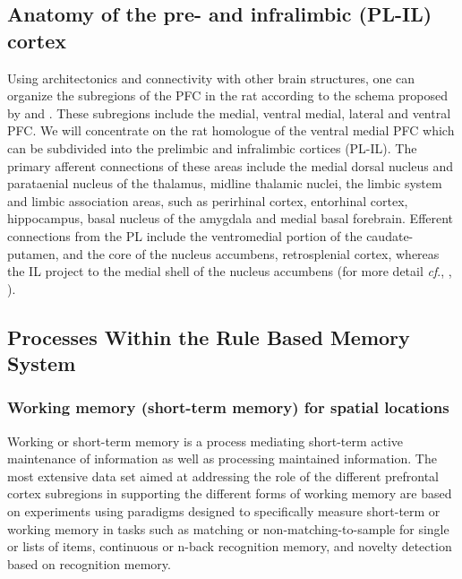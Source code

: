 \documentclass[doc, longtable]{apa6}
\begin{document}
\subsection{Anatomy of the pre- and infralimbic (PL-IL) cortex}
Using architectonics and connectivity with other brain structures, one can organize the subregions of the PFC in the rat according to the schema proposed by \textcite{Groenewegen2000a} and  \textcite{Uylings1990a}. These subregions include the medial, ventral medial, lateral and ventral PFC. We will concentrate on the rat homologue of the ventral medial PFC which can be subdivided into the prelimbic and infralimbic cortices (PL-IL). The primary afferent connections of these areas include the medial dorsal nucleus and parataenial nucleus of the thalamus, midline thalamic nuclei, the limbic system and limbic association areas, such as perirhinal cortex, entorhinal cortex, hippocampus, basal nucleus of the amygdala and medial basal forebrain. Efferent connections from the PL include the ventromedial portion of the caudate-putamen, and the core of the nucleus accumbens, retrosplenial cortex, whereas the IL project to the medial shell of the nucleus accumbens (for more detail \textit{cf}., \cite{Heidbreder2003a}, \cite{Hoover2007a}).

\subsection{Processes Within the Rule Based Memory System}
\subsubsection{Working memory (short-term memory) for spatial locations}
Working or short-term memory is a process mediating short-term active maintenance of information as well as processing maintained information. The most extensive data set aimed at addressing the role of the different prefrontal cortex subregions in supporting the different forms of working memory are based on experiments using paradigms designed to specifically measure short-term or working memory in tasks such as matching or non-matching-to-sample for single or lists of items, continuous or n-back recognition memory, and novelty detection based on recognition memory.
	
\end{document}
